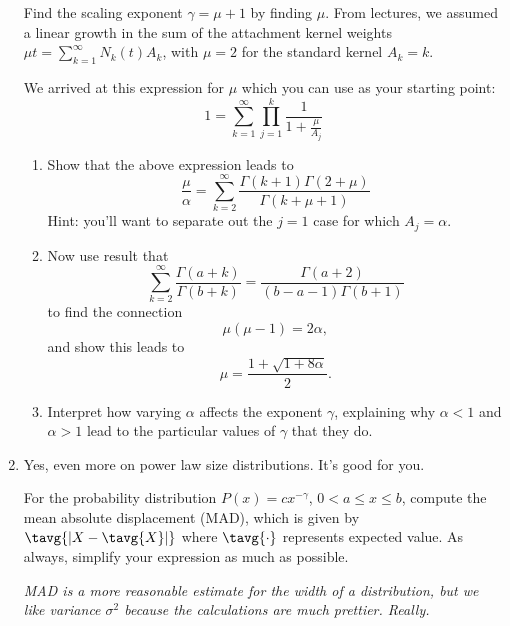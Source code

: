 \begin{enumerate}
  Find the scaling exponent $\gamma = \mu + 1$ by finding $\mu$.
  From lectures, we assumed a linear growth in the sum
  of the attachment kernel weights $\mu t = \sum_{k=1}^{\infty} N_{k}(t) A_{k}$,
  with $\mu=2$ for the standard kernel $A_{k}=k$.

  We arrived at this expression for $\mu$
  which you can use as your starting point:
  $$
  1 =
  \sum_{k=1}^{\infty} 
  \prod_{j=1}^{k}
  \frac{1}{1 + \frac{\mu}{A_{j}}}
  $$

  \begin{enumerate}
  \item
    Show that the above expression leads to 
    $$
    \frac{\mu}{\alpha}
    =
    \sum_{k=2}^{\infty} 
    \frac{\Gamma(k+1)\Gamma(2+\mu)}{\Gamma(k+\mu+1)}
    $$
    Hint: you'll want to separate out the $j=1$ case
    for which $A_{j}=\alpha$.
  \item
    Now use result that~\cite{krapivsky2001a}
    $$
    \sum_{k=2}^{\infty}
    \frac{\Gamma(a+k)}{\Gamma(b+k)}
    =
    \frac{\Gamma(a+2)}{(b-a-1)\Gamma(b+1)}
    $$
    to find the connection
    $$
    \mu(\mu-1) = 2\alpha,
    $$
    and show this leads to 
    $$
    \mu = \frac{1+\sqrt{1+8\alpha}}{2}.
    $$
  \item
    Interpret how varying $\alpha$ affects 
    the exponent $\gamma$, explaining why $\alpha<1$
    and $\alpha>1$ lead to the particular values
    of $\gamma$ that they do.
  \end{enumerate}

  
   \solutionstart


   \solutionend



\item
  Yes, even more on power law size distributions.
  It's good for you.
  
  For the probability distribution $P(x) = c x^{-\gamma}$,
  $0 < a \le x \le b$,
  compute the mean absolute displacement (MAD),
  which is given by
  $\tavg{|X - \tavg{X}|}$ where $\tavg{\cdot}$ represents 
  expected value.  As always, simplify your expression
  as much as possible.
  
  \textit{MAD is a more reasonable estimate for the width
    of a distribution, but we like variance $\sigma^{2}$ because
    the calculations are much prettier.  Really.}

  
   \solutionstart



\end{enumerate}

